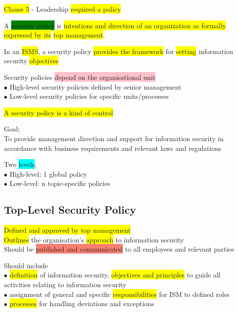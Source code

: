 \documentclass[tikz,border=10pt]{project_plan}
\newcommand{\bulletPoint}{\hspace{-3.1pt}$\bullet$ \hspace{5pt}}
\begin{document}
\colorbox{yellow}{Clause 5} - Leadership \colorbox{yellow}{required a policy}

A \colorbox{green}{security policy} is
\colorbox{yellow}{intentions and direction of an organization as formally expressed by its} \colorbox{yellow}{top management}.

In an \colorbox{yellow}{ISMS}, a security policy \colorbox{yellow}{provides the framework} for \colorbox{yellow}{setting} information security \colorbox{yellow}{objectives}

Security policies \colorbox{pink}{depend on the organisational unit}\\
\bulletPoint High-level security policies defined by senior management\\
\bulletPoint Low-level security policies for specific units/processes

\colorbox{yellow}{A security policy is a kind of control}

Goal;\\
To provide management direction and support for information security in
accordance with business requirements and relevant laws and regulations

Two \colorbox{cyan}{levels};\\
\bulletPoint High-level: 1 global policy\\
\bulletPoint Low-level: n topic-specific policies

\subsection{Top-Level Security Policy}

\colorbox{yellow}{Defined and approved by top management}\\
\colorbox{yellow}{Outlines} the organisation’s \colorbox{yellow}{approach} to information security\\
Should be \colorbox{Salmon}{published and communicated} to all employees and relevant parties

Should include\\
\bulletPoint \colorbox{yellow}{definition} of information security, \colorbox{yellow}{objectives and principles} to guide all activities relating to information security\\
\bulletPoint assignment of general and specific \colorbox{yellow}{responsibilities} for ISM to defined roles\\
\bulletPoint \colorbox{yellow}{processes} for handling deviations and exceptions
\end{document}
